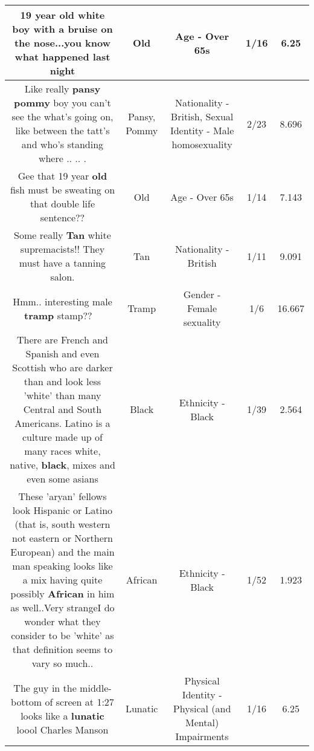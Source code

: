 \documentclass[11pt]{article}
\newlength\mylength
\begin{document}
\begin{center}
\begin{longtable}{|C{.65\mylength}|C{.30\mylength}|C{.12\mylength}|C{.12\mylength}|C{.12\mylength}|}
  \small 19 year \textbf{old} white boy with a bruise on the nose...you know what happened last night\normalsize   & Old & Age - Over 65s & 1/16 & 6.25 \\  \hline
  \small Like really \textbf{pansy} \textbf{pommy} boy you can't see the what's going on, like between the tatt's and who's standing where .. .. .\normalsize   & Pansy, Pommy & Nationality - British, Sexual Identity - Male homosexuality & 2/23 & 8.696 \\  \hline
  \small Gee that 19 year \textbf{old} fish must be sweating on that double life sentence??\normalsize   & Old & Age - Over 65s & 1/14 & 7.143 \\  \hline
  \small Some really \textbf{Tan} white supremacists!! They must have a tanning salon.\normalsize   & Tan & Nationality - British & 1/11 & 9.091 \\  \hline
  \small Hmm.. interesting male \textbf{tramp} stamp?? 🤔🤔\normalsize   & Tramp & Gender - Female sexuality & 1/6 & 16.667 \\  \hline
  \small There are French and Spanish and even Scottish who are darker than and look less 'white' than many Central and South Americans. Latino is a culture made up of many races white, native, \textbf{black}, mixes and even some asians\normalsize   & Black & Ethnicity - Black & 1/39 & 2.564 \\  \hline
  \small These 'aryan' fellows look Hispanic or Latino (that is, south western not eastern or Northern European) and the main man speaking looks like a mix having quite possibly \textbf{African} in him as well..Very strangeI do wonder what they consider to be 'white' as that definition seems to vary so much..\normalsize   & African & Ethnicity - Black & 1/52 & 1.923 \\  \hline
  \small The guy in the middle-bottom of screen at 1:27 looks like a \textbf{lunatic} loool Charles Manson\normalsize   & Lunatic & Physical Identity - Physical (and Mental) Impairments & 1/16 & 6.25 \\  \hline

\end{longtable}
\end{center}
\end{document}
